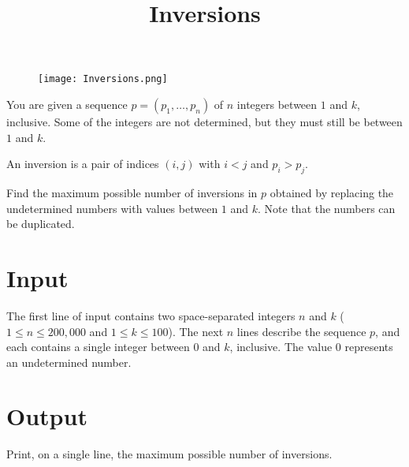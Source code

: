 \documentclass{article}
\title{Inversions}
\date{}
\begin{document}
\maketitle
\begin{figure}[h!]
\centering
\texttt{[image: Inversions.png]}
\end{figure}

You are given a sequence $p = (p_1, \ldots, p_n)$ of $n$ integers
between $1$ and $k$, inclusive.
Some of the integers are not determined, but they must still be between $1$ and $k$.

An inversion is a pair of indices $(i, j)$ with $i < j$ and $p_i > p_j$.

Find the maximum possible number of inversions in $p$ obtained by
replacing the undetermined numbers with values between $1$ and $k$.
Note that the numbers can be duplicated.

\section{Input}

The first line of input contains two space-separated integers $n$ and $k$ ($1 \le n \le 200{,}000$ and $1 \le k \le 100$).
The next $n$ lines describe the sequence $p$, and each contains a single integer between $0$ and $k$, inclusive. The value $0$ represents an undetermined number.

\section{Output}

Print, on a single line, the maximum possible number of inversions.

\end{document}
